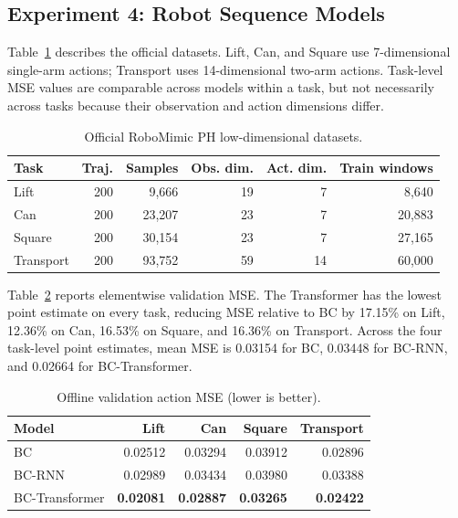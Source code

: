 \documentclass[10pt]{article}
\begin{document}
\subsection{Experiment 4: Robot Sequence Models}

Table~\ref{tab:robot-data} describes the official datasets. Lift, Can, and
Square use 7-dimensional single-arm actions; Transport uses 14-dimensional
two-arm actions. Task-level MSE values are comparable across models within a
task, but not necessarily across tasks because their observation and action
dimensions differ.

\begin{table}[ht]
  \centering
  \caption{Official RoboMimic PH low-dimensional datasets.}
  \label{tab:robot-data}
  \small
  \begin{tabular}{@{}lrrrrr@{}}
    \toprule
    Task & Traj. & Samples & Obs. dim. & Act. dim. & Train windows \\
    \midrule
    Lift & 200 & 9,666 & 19 & 7 & 8,640 \\
    Can & 200 & 23,207 & 23 & 7 & 20,883 \\
    Square & 200 & 30,154 & 23 & 7 & 27,165 \\
    Transport & 200 & 93,752 & 59 & 14 & 60,000 \\
    \bottomrule
  \end{tabular}
\end{table}

Table~\ref{tab:robot-results} reports elementwise validation MSE. The Transformer
has the lowest point estimate on every task, reducing MSE relative to BC by
17.15\% on Lift, 12.36\% on Can, 16.53\% on Square, and 16.36\% on Transport.
Across the four task-level point estimates, mean MSE is 0.03154 for BC, 0.03448
for BC-RNN, and 0.02664 for BC-Transformer.

\begin{table}[ht]
  \centering
  \caption{Offline validation action MSE (lower is better).}
  \label{tab:robot-results}
  \small
  \begin{tabular}{@{}lrrrr@{}}
    \toprule
    Model & Lift & Can & Square & Transport \\
    \midrule
    BC & 0.02512 & 0.03294 & 0.03912 & 0.02896 \\
    BC-RNN & 0.02989 & 0.03434 & 0.03980 & 0.03388 \\
    BC-Transformer & \textbf{0.02081} & \textbf{0.02887} &
      \textbf{0.03265} & \textbf{0.02422} \\
    \bottomrule
  \end{tabular}
\end{table}
\end{document}
